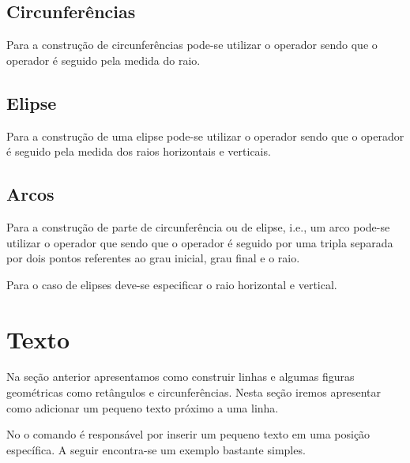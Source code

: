 
\subsection{Circunfer\^{e}ncias}
Para a constru\c{c}\~{a}o de circunfer\^{e}ncias pode-se utilizar o operador  sendo que o operador \'{e} seguido pela medida do raio.


\subsection{Elipse}
Para a constru\c{c}\~{a}o de uma elipse pode-se utilizar o operador  sendo que o operador \'{e} seguido pela medida dos raios horizontais e verticais.


\subsection{Arcos}
Para a constru\c{c}\~{a}o de parte de circunfer\^{e}ncia ou de elipse, i.e., um arco pode-se utilizar o operador  que sendo que o operador \'{e} seguido por uma tripla separada por dois pontos referentes ao grau inicial, grau final e o raio.


Para o caso de elipses deve-se especificar o raio horizontal e vertical.


\section{Texto}
Na se\c{c}\~{a}o anterior apresentamos como construir linhas e algumas figuras geom\'{e}tricas como ret\^{a}ngulos e circunfer\^{e}ncias. Nesta se\c{c}\~{a}o iremos apresentar como adicionar um pequeno texto pr\'{o}ximo a uma linha.

No \TikZ o comando  \'{e} respons\'{a}vel por inserir um pequeno texto em uma posi\c{c}\~{a}o espec\'{i}fica. A seguir encontra-se um exemplo bastante simples.

